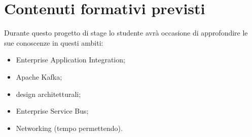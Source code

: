 \section*{Contenuti formativi previsti}
Durante questo progetto di stage lo studente avrà occasione di approfondire le sue conoscenze in questi ambiti:
\begin{itemize}
  \item Enterprise Application Integration;
  \item Apache Kafka;
  \item design architetturali;
  \item Enterprise Service Bus;
  \item Networking (tempo permettendo).
\end{itemize}
\newpage
